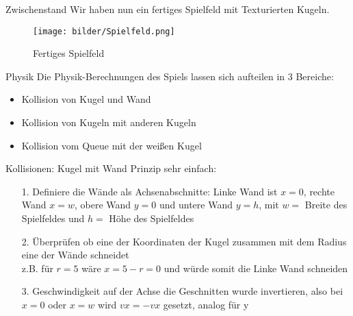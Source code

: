 \begin{frame}{Zwischenstand}
Wir haben nun ein fertiges Spielfeld mit Texturierten Kugeln.
\begin{figure}
	\caption{Fertiges Spielfeld}
	\texttt{[image: bilder/Spielfeld.png]}
\end{figure}
\end{frame}
\begin{frame}{Physik}
Die Physik-Berechnungen des Spiels lassen sich aufteilen in 3 Bereiche:
\begin{itemize}
	\item Kollision von Kugel und Wand
	\item Kollision von Kugeln mit anderen Kugeln
	\item Kollision vom Queue mit der weißen Kugel
\end{itemize}
\end{frame}
\begin{frame}{Kollisionen: Kugel mit Wand}
Prinzip sehr einfach:
\begin{itemize}
	\item [1.] Definiere die Wände als Achsenabschnitte: Linke Wand ist $x=0$, rechte Wand $x=w$, obere Wand $y=0$ und untere Wand $y=h$, mit $w = $ Breite des Spielfeldes und $h = $ Höhe des Spielfeldes
	\item [2.] Überprüfen ob eine der Koordinaten der Kugel zusammen mit dem Radius eine der Wände schneidet \\
				z.B. für $r=5$ wäre $x = 5 - r = 0 $ und würde somit die Linke Wand schneiden
	\item [3.] Geschwindigkeit auf der Achse die Geschnitten wurde invertieren, also bei $x=0$ oder $x=w$ wird $vx = -vx$ gesetzt, analog für y
\end{itemize}
\end{frame}


